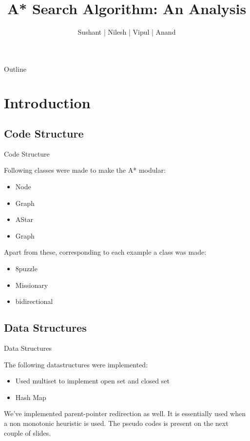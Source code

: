 \documentclass{beamer}
\title[Your Short Title]{A* Search Algorithm: An Analysis}
\author{Sushant | Nilesh | Vipul | Anand}
\institute{Indian Institute of Technology, Bombay}
\begin{document}
\begin{frame}
  \titlepage
\end{frame}

\begin{frame}{Outline}
  \tableofcontents
\end{frame}

\section{Introduction}

\subsection{Code Structure}
\begin{frame}{Code Structure}

Following classes were made to make the A* modular:
\begin{itemize}
  \item Node
  \item Graph
  \item AStar
  \item Graph
\end{itemize}
Apart from these, corresponding to each example a class was made:
\begin{itemize}
  \item 8puzzle
  \item Missionary
  \item bidirectional

\end{itemize}
\end{frame}

\subsection{Data Structures}

\begin{frame}{Data Structures}

The following datastructures were implemented:
\begin{itemize}
\item Used multiset to implement open set and closed set
\item Hash Map
\end{itemize}

We've implemented parent-pointer redirection as well.
It is essentially used when a non monotonic heuristic is used.
The pseudo codes is present on the next couple of slides.
\end{frame}
\end{document}
